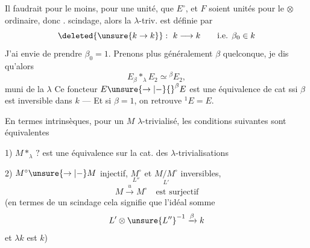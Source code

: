 Il faudrait pour le moins,  pour une unité,
que $E^\circ$, et $F$ soient unités pour le $\otimes$ ordinaire, donc  .
  scindage, alors la $\lambda$-triv. est définie par
\[
\deleted{\unsure{k\to k}}:\ k\longrightarrow k\qquad\text{i.e. }\beta_0\in k
\]
J'ai envie de prendre $\beta_0=1$. Prenons plus généralement $\beta$ quelconque, je dis qu'alors
\[
E_\beta\mathbin{*}_{\lambda}E_2\simeq {}^\beta E_2,
\]
muni de la $\lambda$ 
Ce foncteur $E\unsure{\to|-}{}^\beta E$  est une équivalence de cat ssi $\beta$ est inversible dans $k$ --- Et si $\beta=1$, on retrouve ${}^1E=E$.

En termes intrinsèques, pour  un $M$ $\lambda$-trivialisé, les conditions suivantes sont équivalentes

1) $M\mathbin{*}_{\lambda}\,?$ est une équivalence sur la cat. des $\lambda$-trivialisations

2) $M^\circ\unsure{\to|-}M$ injectif, $\underset{L''}{M^\circ}$ et $\underset{L'}{M/M^\circ}$ inversibles,
\[
M\xrightarrow{u}M^\circ\quad\text{est surjectif}
\]
(en termes de  un scindage cela signifie que l'idéal somme 
\[
L'\otimes\unsure{L''}^{-1}\xrightarrow{\beta}k
\]
et $\lambda k$ est $k$)

